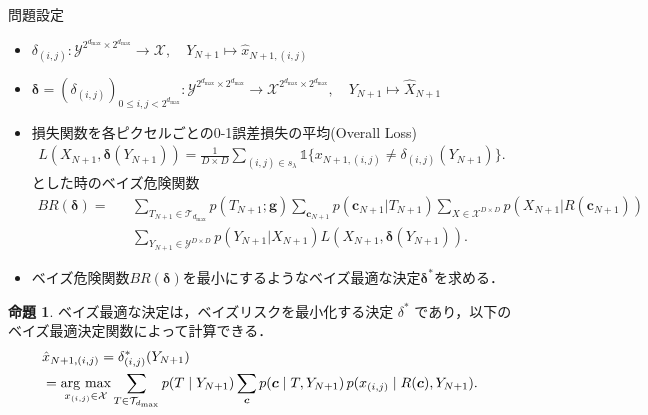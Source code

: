 \documentclass{jsarticle}
\theoremstyle{definition}
\newtheorem{prop}{命題}
\newcommand{\argmax}{\mathop{\rm arg~max}}
\begin{document}
\begin{itembox}[l]{問題設定}
    \begin{itemize}
      \item $\delta_{(i,j)} : \mathcal{Y}^{2^{d_{\text{max}}}\times 2^{d_{\text{max}}}} \rightarrow \mathcal{X},\quad {Y}_{N+1}\mapsto \hat{x}_{N+1,(i,j)}$
      \item $\bm{\delta}=(\delta_{(i,j)})_{0 \leq i, j <2^{d_{\text{max}}}} : \mathcal{Y}^{2^{d_{\text{max}}}\times 2^{d_{\text{max}}}} \rightarrow \mathcal{X}^{2^{d_{\text{max}}}\times 2^{d_{\text{max}}}},\quad {Y}_{N+1}\mapsto \hat{X}_{N+1}$
    \end{itemize}


    \begin{itemize}
      \item 損失関数を各ピクセルごとの0-1誤差損失の平均(Overall Loss)
            \begin{eqnarray}
        L(X_{N+1}, \bm{\delta}(Y_{N+1})) = \frac{1}{D\times D} \sum_{(i,j)\in s_{\lambda}} \mathds{1} \{x_{N+1, (i,j)} \neq \delta_{(i,j)}(Y_{N+1})\}.
      \end{eqnarray}
        とした時のベイズ危険関数
      \begin{eqnarray}
        BR(\bm{\delta}) =&& \sum_{T_{N+1}\in \mathcal{T}_{d_{\text{max}}}} p(T_{N+1};\bm{g}) \sum_{\bm{c}_{N+1}} p(\bm{c}_{N+1}|T_{N+1})\sum_{X\in\mathcal{X}^{D\times D}} p(X_{N+1}|R(\bm{c}_{N+1})) \nonumber\\
        &&\sum_{Y_{N+1}\in \mathcal{Y}^{D\times D}} p(Y_{N+1}|X_{N+1}) L(X_{N+1}, \bm{\delta}(Y_{N+1})).
      \end{eqnarray}
    \end{itemize}

  \begin{itemize}
  \item ベイズ危険関数$BR(\bm{\delta})$を最小にするようなベイズ最適な決定$\bm{\delta}^*$を求める．
  \end{itemize}
  
\end{itembox}

\begin{prop}
ベイズ最適な決定は，ベイズリスクを最小化する決定 $\delta^*$ であり，以下のベイズ最適決定関数によって計算できる．
\begin{align}
&\hat{x}_{N+1,(i,j)} = \delta^*_{(i,j)}(Y_{N+1}) \nonumber\\
&= \argmax_{x_{(i,j)}\in\mathcal{X}}
  \sum_{T\in\mathcal{T}_{d_{\mathrm{max}}}}
    p(T\mid Y_{N+1})
  \sum_{\bm{c}}
    p(\bm{c}\mid T, Y_{N+1})
    \,p(x_{(i,j)}\mid R(\bm{c}), Y_{N+1}).
  \label{BayesOptimalEstimation2}
\end{align}
\label{proposition3}
\end{prop}
\end{document}
